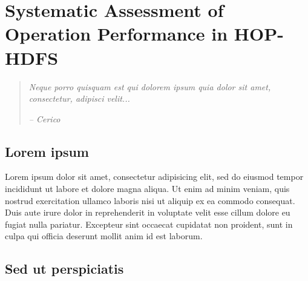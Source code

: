 
%
%
%


\chapter{Systematic Assessment of Operation Performance in HOP-HDFS}
\label{ch:22Assessment}

\begin{quotation}
  {\small\it Neque porro quisquam est qui dolorem ipsum quia dolor sit amet, consectetur, adipisci velit...}

{\small\it -- Cerico}
\end{quotation}



\section{Lorem ipsum}

Lorem ipsum dolor sit amet, consectetur adipisicing elit, sed do eiusmod tempor incididunt ut labore et dolore magna aliqua. Ut enim ad minim veniam, quis nostrud exercitation ullamco laboris nisi ut aliquip ex ea commodo consequat. Duis aute irure dolor in reprehenderit in voluptate velit esse cillum dolore eu fugiat nulla pariatur. Excepteur sint occaecat cupidatat non proident, sunt in culpa qui officia deserunt mollit anim id est laborum.


\section{Sed ut perspiciatis}


